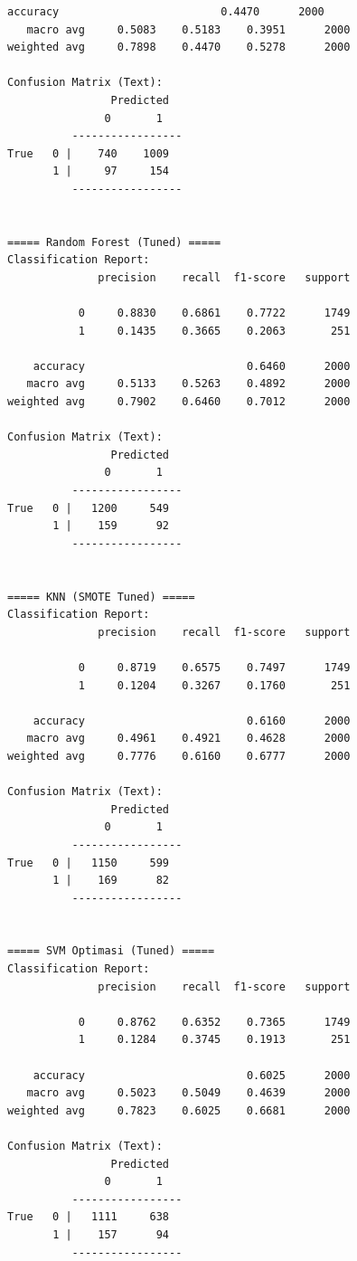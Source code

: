 \begin{lstlisting}[caption={Output 1}]
    accuracy                         0.4470      2000
   macro avg     0.5083    0.5183    0.3951      2000
weighted avg     0.7898    0.4470    0.5278      2000

Confusion Matrix (Text):
                Predicted
               0       1
          -----------------
True   0 |    740    1009
       1 |     97     154
          -----------------


===== Random Forest (Tuned) =====
Classification Report:
              precision    recall  f1-score   support

           0     0.8830    0.6861    0.7722      1749
           1     0.1435    0.3665    0.2063       251

    accuracy                         0.6460      2000
   macro avg     0.5133    0.5263    0.4892      2000
weighted avg     0.7902    0.6460    0.7012      2000

Confusion Matrix (Text):
                Predicted
               0       1
          -----------------
True   0 |   1200     549
       1 |    159      92
          -----------------


===== KNN (SMOTE Tuned) =====
Classification Report:
              precision    recall  f1-score   support

           0     0.8719    0.6575    0.7497      1749
           1     0.1204    0.3267    0.1760       251

    accuracy                         0.6160      2000
   macro avg     0.4961    0.4921    0.4628      2000
weighted avg     0.7776    0.6160    0.6777      2000

Confusion Matrix (Text):
                Predicted
               0       1
          -----------------
True   0 |   1150     599
       1 |    169      82
          -----------------


===== SVM Optimasi (Tuned) =====
Classification Report:
              precision    recall  f1-score   support

           0     0.8762    0.6352    0.7365      1749
           1     0.1284    0.3745    0.1913       251

    accuracy                         0.6025      2000
   macro avg     0.5023    0.5049    0.4639      2000
weighted avg     0.7823    0.6025    0.6681      2000

Confusion Matrix (Text):
                Predicted
               0       1
          -----------------
True   0 |   1111     638
       1 |    157      94
          -----------------



\end{lstlisting}
